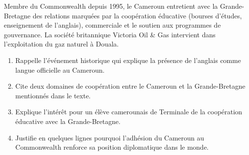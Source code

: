 \documentclass[11pt]{article}
\begin{document}
\begin{exercice}
Membre du Commonwealth depuis 1995, le Cameroun entretient avec la Grande-Bretagne des relations marquées par la coopération éducative (bourses d'études, enseignement de l'anglais), commerciale et le soutien aux programmes de gouvernance. La société britannique Victoria Oil \& Gas intervient dans l'exploitation du gaz naturel à Douala.
\begin{enumerate}
\item Rappelle l'événement historique qui explique la présence de l'anglais comme langue officielle au Cameroun.
\item Cite deux domaines de coopération entre le Cameroun et la Grande-Bretagne mentionnés dans le texte.
\item Explique l'intérêt pour un élève camerounais de Terminale de la coopération éducative avec la Grande-Bretagne.
\item Justifie en quelques lignes pourquoi l'adhésion du Cameroun au Commonwealth renforce sa position diplomatique dans le monde.
\end{enumerate}
\end{exercice}
\end{document}

